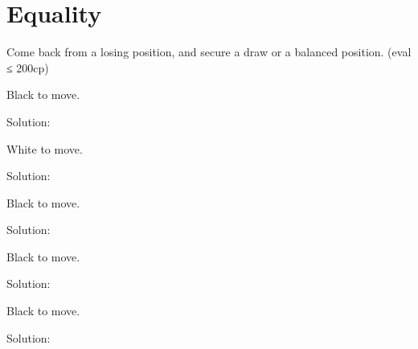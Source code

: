 \documentclass{book}
\begin{document}
\section{Equality}
Come back from a losing position, and secure a draw or a balanced position. (eval ≤ 200cp)\begin{multicols}{2} 
\begin{samepage} 
\newgame 


 
\showboard
 
 Black to move. 
 
Solution: 
 
\end{samepage}\begin{samepage} 
\newgame 


 
\showboard
 
 White to move. 
 
Solution: 
 
\end{samepage}\begin{samepage} 
\newgame 


 
\showboard
 
 Black to move. 
 
Solution: 
 
\end{samepage}\begin{samepage} 
\newgame 


 
\showboard
 
 Black to move. 
 
Solution: 
 
\end{samepage}\begin{samepage} 
\newgame 


 
\showboard
 
 Black to move. 
 
Solution: 
 
\end{samepage}\end{multicols} 
\newpage 
\end{document}
